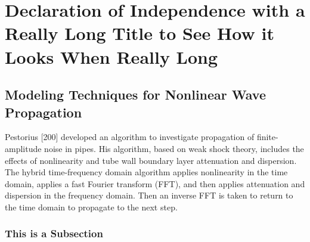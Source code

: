 \vspace*{-80mm}
\chapter{Declaration of Independence with a Really Long Title to See How it Looks When Really Long} \label{chapter1:introduction}

\section{\sloppy Modeling Techniques for Nonlinear Wave Propagation}
Pestorius [200] developed an algorithm to investigate propagation of finite-am\-pli\-tude noise in pipes. His algorithm, based on weak shock theory, includes the effects of nonlinearity and tube wall boundary layer attenuation and dispersion. The hybrid time-frequency domain algorithm applies nonlinearity in the time domain, applies a fast Fourier transform (FFT), and then applies attenuation and dispersion in the frequency domain.  Then an inverse FFT is taken to return to the time domain to propagate to the next step.

\subsection{This is a Subsection}

